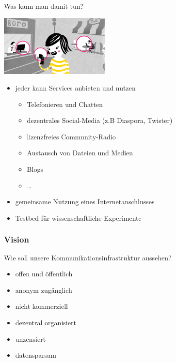 \documentclass[10pt,handout]{beamer}
\begin{document}
\begin{frame}{Was kann man damit tun?}
	\vfill
	\begin{center}
		\includegraphics[width=5.5cm]{images/verbindet}
	\end{center}
	
	\begin{itemize}[<+->]
		\item jeder kann Services anbieten und nutzen
		\begin{itemize}
			\item Telefonieren und Chatten
			\item dezentrales Social-Media (z.B Diaspora, Twister)
			\item lizenzfreies Community-Radio
			\item Austausch von Dateien und Medien
			\item Blogs
			\item \ldots
		\end{itemize}
		\item gemeinsame Nutzung eines Internetanschlusses
		\item Testbed für wissenschaftliche Experimente
	\end{itemize}
	\vfill
\end{frame}

\begin{frame}
	\frametitle{Vision}
	
	Wie soll unsere Kommunikationsinfrastruktur aussehen?
	
	\begin{itemize}[<+->]
		\item offen und öffentlich
		\item anonym zugänglich
		\item nicht kommerziell
		\item dezentral organisiert
		\item unzensiert
		\item datensparsam
	\end{itemize}
\end{frame}
\end{document}
